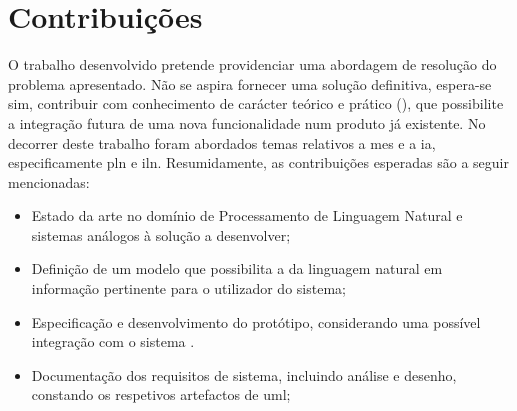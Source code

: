 

\section{Contribuições}
\label{sec:chap01_contributions}
O trabalho desenvolvido pretende providenciar uma abordagem de resolução do problema apresentado. Não se aspira fornecer uma solução definitiva, espera-se sim, contribuir com conhecimento de carácter teórico e prático (), que possibilite a integração futura de uma nova funcionalidade num produto já existente. No decorrer deste trabalho foram abordados temas relativos a \gls{mes} e a \gls{ia}, especificamente \gls{pln} e \gls{iln}. Resumidamente, as contribuições esperadas são a seguir mencionadas:
%
\begin{itemize}
    \item
    {
        Estado da arte no domínio de Processamento de Linguagem Natural e sistemas análogos à solução a desenvolver;
    }
    \item 
    {
        Definição de um modelo que possibilita a  da linguagem natural em informação pertinente para o utilizador do sistema; 
    }
    \item
    {
        Especificação e desenvolvimento do protótipo, considerando uma possível integração com o sistema {\productname}.
    }
    \item 
    {
        Documentação dos requisitos de sistema, incluindo análise e desenho, constando os respetivos artefactos de \gls{uml};
    }
\end{itemize}

